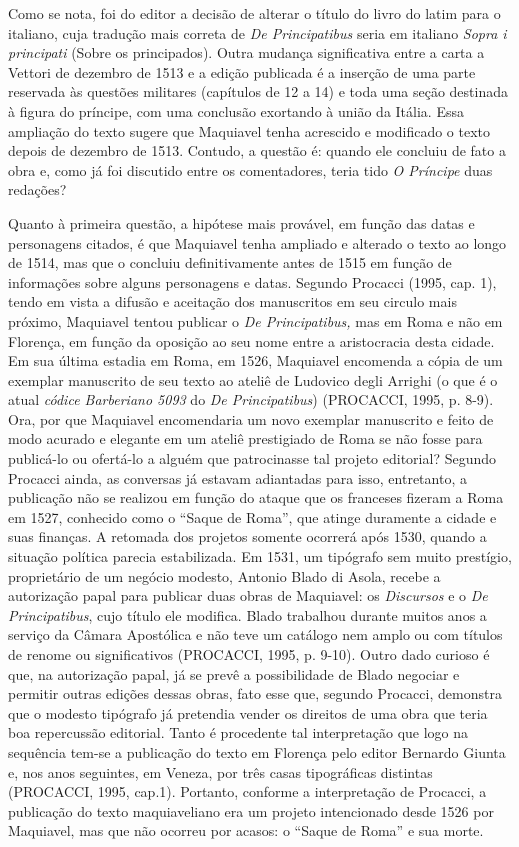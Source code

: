 Como se nota, foi do editor a decisão de alterar o título do livro do
latim para o italiano, cuja tradução mais correta de \emph{De
Principatibus} seria em italiano \emph{Sopra i principati} (Sobre os
principados). Outra mudança significativa entre a carta a Vettori de
dezembro de 1513 e a edição publicada é a inserção de uma parte
reservada às questões militares (capítulos de 12 a 14) e toda uma seção
destinada à figura do príncipe, com uma conclusão exortando à união da
Itália. Essa ampliação do texto sugere que Maquiavel tenha acrescido e
modificado o texto depois de dezembro de 1513. Contudo, a questão é:
quando ele concluiu de fato a obra e, como já foi discutido entre os
comentadores, teria tido \emph{O Príncipe} duas redações?

Quanto à primeira questão, a hipótese mais provável, em função das datas
e personagens citados, é que Maquiavel tenha ampliado e alterado o texto
ao longo de 1514, mas que o concluiu definitivamente antes de 1515 em
função de informações sobre alguns personagens e datas. Segundo Procacci
(1995, cap. 1), tendo em vista a difusão e aceitação dos manuscritos em
seu circulo mais próximo, Maquiavel tentou publicar o \emph{De
Principatibus,} mas em Roma e não em Florença, em função da oposição ao
seu nome entre a aristocracia desta cidade. Em sua última estadia em
Roma, em 1526, Maquiavel encomenda a cópia de um exemplar manuscrito de
seu texto ao ateliê de Ludovico degli Arrighi (o que é o atual
\emph{códice Barberiano 5093} do \emph{De Principatibus}) (PROCACCI,
1995, p. 8-9). Ora, por que Maquiavel encomendaria um novo exemplar
manuscrito e feito de modo acurado e elegante em um ateliê prestigiado
de Roma se não fosse para publicá-lo ou ofertá-lo a alguém que
patrocinasse tal projeto editorial? Segundo Procacci ainda, as conversas
já estavam adiantadas para isso, entretanto, a publicação não se
realizou em função do ataque que os franceses fizeram a Roma em 1527,
conhecido como o ``Saque de Roma'', que atinge duramente a cidade e suas
finanças. A retomada dos projetos somente ocorrerá após 1530, quando a
situação política parecia estabilizada. Em 1531, um tipógrafo sem muito
prestígio, proprietário de um negócio modesto, Antonio Blado di Asola,
recebe a autorização papal para publicar duas obras de Maquiavel: os
\emph{Discursos} e o \emph{De Principatibus}, cujo título ele modifica.
Blado trabalhou durante muitos anos a serviço da Câmara Apostólica e não
teve um catálogo nem amplo ou com títulos de renome ou significativos
(PROCACCI, 1995, p. 9-10). Outro dado curioso é que, na autorização
papal, já se prevê a possibilidade de Blado negociar e permitir outras
edições dessas obras, fato esse que, segundo Procacci, demonstra que o
modesto tipógrafo já pretendia vender os direitos de uma obra que teria
boa repercussão editorial. Tanto é procedente tal interpretação que logo
na sequência tem-se a publicação do texto em Florença pelo editor
Bernardo Giunta e, nos anos seguintes, em Veneza, por três casas
tipográficas distintas (PROCACCI, 1995, cap.1). Portanto, conforme a
interpretação de Procacci, a publicação do texto maquiaveliano era um
projeto intencionado desde 1526 por Maquiavel, mas que não ocorreu por
acasos: o ``Saque de Roma'' e sua morte.

